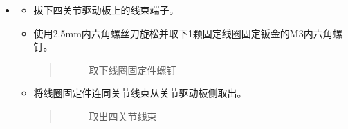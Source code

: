 \documentclass[a4paper,11pt,english,openany,oneside]{sphinxmanual}
\begin{document}
\begin{itemize}
\begin{itemize}
\end{itemize}

\item {} 
\sphinxAtStartPar
{}
\begin{itemize}
\item {} 
\sphinxAtStartPar
拔下四关节驱动板上的线束端子。

\item {} 
\sphinxAtStartPar
使用2.5mm内六角螺丝刀旋松并取下1颗固定线圈固定钣金的M3内六角螺钉。
\begin{quote}

\begin{figure}[H]
\centering
\capstart

\noindent{}
\caption{取下线圈固定件螺钉}\label{\detokenize{_u66f4_u6362_u5173_u8282:id81}}\end{figure}
\end{quote}

\item {} 
\sphinxAtStartPar
将线圈固定件连同关节线束从关节驱动板侧取出。
\begin{quote}

\begin{figure}[H]
\centering
\capstart

\noindent{}
\caption{取出四关节线束}\label{\detokenize{_u66f4_u6362_u5173_u8282:id82}}\end{figure}
\end{quote}

\end{itemize}

\end{itemize}
\end{document}
